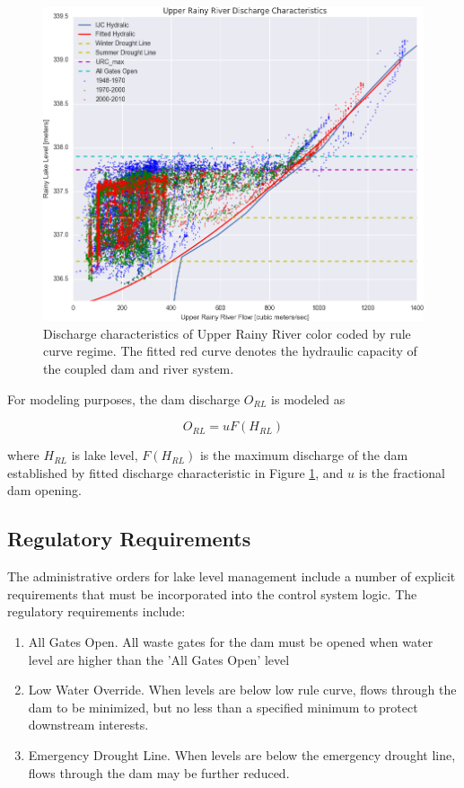 \documentclass[preprint,times]{elsarticle}
\begin{document}
\begin{figure}
\includegraphics[width=\linewidth]{RainyRiverDischarge_Fit}
\caption{Discharge characteristics of Upper Rainy River color coded by rule curve regime. The fitted red curve denotes the hydraulic capacity of the coupled dam and river system.}\label{figure:RLdischarge}
\end{figure}

For modeling purposes, the dam discharge $O_{RL}$ is modeled as 

$$ O_{RL} = u F(H_{RL}) $$

\noindent
where $H_{RL}$ is lake level, $F(H_{RL})$ is the maximum discharge of the dam established by fitted discharge characteristic in Figure \ref{figure:RLdischarge}, and $u$ is the fractional dam opening.

\subsection{Regulatory Requirements}

The administrative orders for lake level management include a number of explicit requirements that must be incorporated into the control system logic.  The regulatory requirements include:

\begin{enumerate}
    \item All Gates Open. All waste gates for the dam must be opened when water level are higher than the 'All Gates Open' level
    \item Low Water Override. When levels are below low rule curve, flows through the dam to be minimized, but no less than a specified minimum to protect downstream interests.
    \item Emergency Drought Line.  When levels are below the emergency drought line, flows through the dam may be further reduced.
\end{enumerate}
\end{document}

